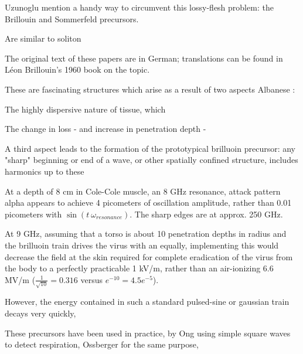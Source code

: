 \documentclass[paper.tex]{subfiles}
\begin{document}
Uzunoglu \cite{Theoretical2020} mention a handy way to circumvent this lossy-flesh problem: the Brillouin and Sommerfeld precursors.

Are similar to soliton 



The original text of these papers are in German; translations can be found in Léon Brillouin's 1960 book\cite{Wave1960} on the topic. \footnotemark



These are fascinating structures which arise as a result of two aspects Albanese \cite{Shortrisetime1989}: 

The highly dispersive nature of tissue, which

The change in loss - and increase in penetration depth - 

A third aspect leads to the formation of the prototypical brilluoin precursor: any "sharp" beginning or end of a wave, or other spatially confined structure, includes harmonics up to these \footnotemark



At a depth of 8 cm in Cole-Cole muscle, an 8 GHz resonance, attack pattern alpha appears to achieve 4 picometers of oscillation amplitude, rather than 0.01 picometers with $\sin(t\ \omega_{resonance})$. The sharp edges are at approx. 250 GHz. 



At 9 GHz, assuming that a torso is about 10 penetration depths in radius and the brilluoin train drives the virus with an equally, implementing this would decrease the field at the skin required for complete eradication of the virus from the body to a perfectly practicable 1 kV/m, rather than an air-ionizing 6.6 MV/m ($\frac{1}{\sqrt{10}}=0.316$ versus $e^{-10}=4.5e^{-5}$). 

However, the energy contained in such a standard pulsed-sine or gaussian train decays very quickly, 

These precursors have been used in practice, by Ong \cite{Detection2003} using simple square waves to detect respiration\footnotemark, Ossberger \cite{Noninvasive2004} for the same purpose,
\end{document}
